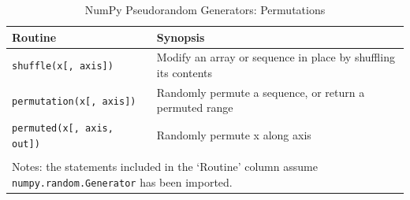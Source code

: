 \documentclass[a4paper,11pt]{book}
\begin{document}
\begin{table}
	\centering
	\caption{NumPy Pseudorandom Generators: Permutations} 
	\label{tab:random_permutations}
	\begin{tabular}{ll}
		\toprule \toprule
			Routine & Synopsis \\
			\midrule
			\texttt{shuffle(x[, axis])} &
                        Modify an array or sequence in place by shuffling its contents\\
                        \texttt{permutation(x[, axis])} &
                        Randomly permute a sequence, or return a permuted range\\
                        \texttt{permuted(x[, axis, out])} &
                        Randomly permute x along axis \\
	     	\bottomrule \\[-1.8ex]
	        \multicolumn{2}{l}{Notes: the statements included in the `Routine' column assume \texttt{numpy.random.Generator} has been imported.} \\
	\end{tabular}
\end{table}
\end{document}

